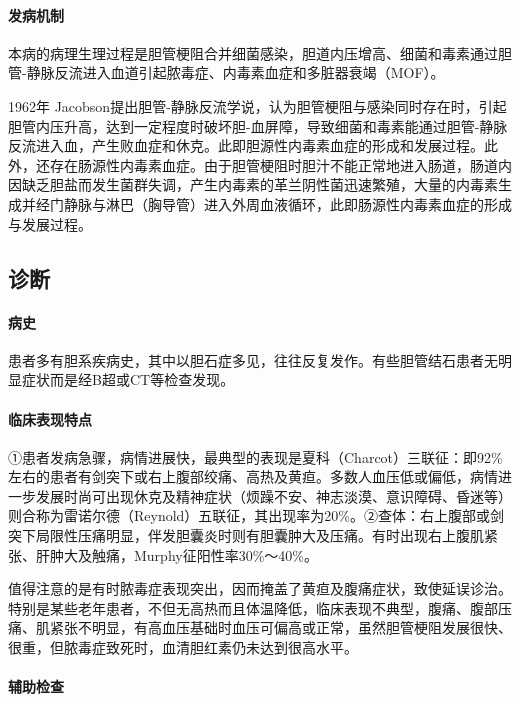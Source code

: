 \paragraph{发病机制}

本病的病理生理过程是胆管梗阻合并细菌感染，胆道内压增高、细菌和毒素通过胆管-静脉反流进入血道引起脓毒症、内毒素血症和多脏器衰竭（MOF）。

1962年
Jacobson提出胆管-静脉反流学说，认为胆管梗阻与感染同时存在时，引起胆管内压升高，达到一定程度时破坏胆-血屏障，导致细菌和毒素能通过胆管-静脉反流进入血，产生败血症和休克。此即胆源性内毒素血症的形成和发展过程。此外，还存在肠源性内毒素血症。由于胆管梗阻时胆汁不能正常地进入肠道，肠道内因缺乏胆盐而发生菌群失调，产生内毒素的革兰阴性菌迅速繁殖，大量的内毒素生成并经门静脉与淋巴（胸导管）进入外周血液循环，此即肠源性内毒素血症的形成与发展过程。

\subsection{诊断}

\paragraph{病史}

患者多有胆系疾病史，其中以胆石症多见，往往反复发作。有些胆管结石患者无明显症状而是经B超或CT等检查发现。

\paragraph{临床表现特点}

①患者发病急骤，病情进展快，最典型的表现是夏科（Charcot）三联征：即92\%左右的患者有剑突下或右上腹部绞痛、高热及黄疸。多数人血压低或偏低，病情进一步发展时尚可出现休克及精神症状（烦躁不安、神志淡漠、意识障碍、昏迷等）则合称为雷诺尔德（Reynold）五联征，其出现率为20\%。②查体：右上腹部或剑突下局限性压痛明显，伴发胆囊炎时则有胆囊肿大及压痛。有时出现右上腹肌紧张、肝肿大及触痛，Murphy征阳性率30\%～40\%。

值得注意的是有时脓毒症表现突出，因而掩盖了黄疸及腹痛症状，致使延误诊治。特别是某些老年患者，不但无高热而且体温降低，临床表现不典型，腹痛、腹部压痛、肌紧张不明显，有高血压基础时血压可偏高或正常，虽然胆管梗阻发展很快、很重，但脓毒症致死时，血清胆红素仍未达到很高水平。

\paragraph{辅助检查}

